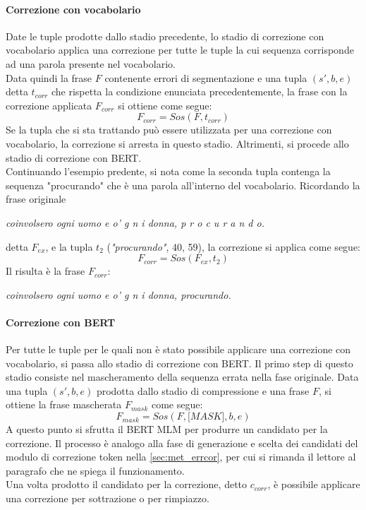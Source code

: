 \paragraph{Correzione con vocabolario}
Date le tuple prodotte dallo stadio precedente, lo stadio di correzione con vocabolario applica una correzione per tutte le tuple la cui sequenza corrisponde ad una parola presente nel vocabolario. \\
Data quindi la frase $F$ contenente errori di segmentazione e una tupla $(s\prime,b,e)$ detta $t_{corr}$ che rispetta la condizione enunciata precedentemente, la frase con la correzione applicata $F_{corr}$ si ottiene come segue:
\begin{equation}
F_{corr} = \textit{Sos}(F,t_{corr})
\end{equation}
Se la tupla che si sta trattando può essere utilizzata per una correzione con vocabolario, la correzione si arresta in questo stadio. Altrimenti, si procede allo stadio di correzione con BERT.\\
Continuando l'esempio predente, si nota come la seconda tupla contenga la sequenza "procurando" che è una parola all'interno del vocabolario. Ricordando la frase originale
\begin{center}
\textit{coinvolsero ogni uomo e o' g n i donna, p r o c u r a n d o.}
\end{center}
detta $F_{ex}$, e la tupla $t_2$ (\textit{"procurando"}, 40, 59), la correzione si applica come segue:
\begin{equation}
F_{corr} = \textit{Sos}(F_{ex},t_{2})
\end{equation}
Il risulta è la frase $F_{corr}$:
\begin{center}
\textit{coinvolsero ogni uomo e o' g n i donna, procurando.}
\end{center}


\paragraph{Correzione con BERT}
Per tutte le tuple per le quali non è stato possibile applicare una correzione con vocabolario, si passa allo stadio di correzione con BERT. Il primo step di questo stadio consiste nel mascheramento della sequenza errata nella fase originale. Data una tupla $(s\prime,b,e)$ prodotta dallo stadio di compressione e una frase $F$, si ottiene la frase mascherata $F_{mask}$ come segue:
\begin{equation}
F_{mask} = \textit{Sos}(F,\textit{[MASK]},b,e)
\end{equation}
A questo punto si sfrutta il BERT MLM per produrre un candidato per la correzione. Il processo è analogo alla fase di generazione e scelta dei candidati del modulo di correzione token nella \autoref{sec:met_errcor}, per cui si rimanda il lettore al paragrafo che ne spiega il funzionamento.\\
Una volta prodotto il candidato per la correzione, detto $c_{corr}$, è possibile applicare una correzione per sottrazione o per rimpiazzo.


